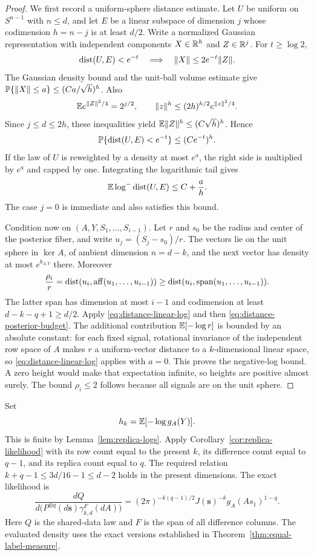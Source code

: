 \begin{proof}
We first record a uniform-sphere distance estimate. Let $U$ be uniform on
$S^{n-1}$ with $n\le d$, and let $E$ be a linear subspace of dimension
$j$ whose codimension $h=n-j$ is at least $d/2$. Write a normalized
Gaussian representation with independent components $X\in\mathbb R^h$ and
$Z\in\mathbb R^j$. For $t\ge\log2$,
\[
 \operatorname{dist}(U,E)<e^{-t}\quad\Longrightarrow\quad
 \lVert X\rVert\le2e^{-t}\lVert Z\rVert.
\]
The Gaussian density bound and the unit-ball volume estimate give
$\mathbb P\{\lVert X\rVert\le a\}\le(Ca/\sqrt h)^h$. Also
\[
 \mathbb E e^{\lVert Z\rVert^2/4}=2^{j/2},\qquad
 \lVert z\rVert^h\le(2h)^{h/2}e^{\lVert z\rVert^2/4}.
\]
Since $j\le d\le2h$, these inequalities yield
$\mathbb E\lVert Z\rVert^h\le(C\sqrt h)^h$. Hence
\[
 \mathbb P\{\operatorname{dist}(U,E)<e^{-t}\}\le(Ce^{-t})^h.
\]
If the law of $U$ is reweighted by a density at most $e^a$, the right side
is multiplied by $e^a$ and capped by one. Integrating the logarithmic tail
gives
\begin{equation}\label{eq:distance-linear-log}
 \mathbb E\log^-\operatorname{dist}(U,E)\le C+\frac ah.
\end{equation}
The case $j=0$ is immediate and also satisfies this bound.

Condition now on $(A,Y,S_1,\ldots,S_{i-1})$. Let $r$ and $s_0$ be the
radius and center of the posterior fiber, and write
$u_j=(S_j-s_0)/r$. The vectors lie on the unit sphere in $\ker A$, of
ambient dimension $n=d-k$, and the next vector has density at most
$e^{b_{A,Y}}$ there. Moreover
\[
 \frac{\rho_i}{r}
 =\operatorname{dist}(u_i,\operatorname{aff}(u_1,\ldots,u_{i-1}))
 \ge\operatorname{dist}(u_i,\operatorname{span}(u_1,\ldots,u_{i-1})).
\]
The latter span has dimension at most $i-1$ and codimension at least
$d-k-q+1\ge d/2$. Apply \eqref{eq:distance-linear-log} and then
\eqref{eq:distance-posterior-budget}. The additional contribution
$\mathbb E[-\log r]$ is bounded by an absolute constant: for each fixed signal,
rotational invariance of the independent row space of $A$ makes $r$ a
uniform-vector distance to a $k$-dimensional linear space, so
\eqref{eq:distance-linear-log} applies with $a=0$.
This proves the negative-log bound. A zero height would make that
expectation infinite, so heights are positive almost surely. The bound
$\rho_i\le2$ follows because all signals are on the unit sphere.
\end{proof}

Set
\[
 h_k=\mathbb E[-\log g_A(Y)].
\]
This is finite by Lemma~\ref{lem:replica-logs}. Apply
Corollary~\ref{cor:replica-likelihood} with its row count equal to the
present $k$, its difference count equal to $q-1$, and its replica count
equal to $q$. The required relation
$k+q-1\le3d/16-1\le d-2$ holds in the present dimensions. The exact
likelihood is
\begin{equation}\label{eq:distance-likelihood}
 \frac{dQ}{d\bigl(P^{\otimes q}(d\mathbf s)\gamma_{k,d}^{F}(dA)\bigr)}
 =(2\pi)^{-k(q-1)/2}J(\mathbf s)^{-k}g_A(As_1)^{1-q}.
\end{equation}
Here $Q$ is the shared-data law and $F$ is the span of all difference
columns. The evaluated density uses the exact versions established in
Theorem~\ref{thm:equal-label-measure}.

